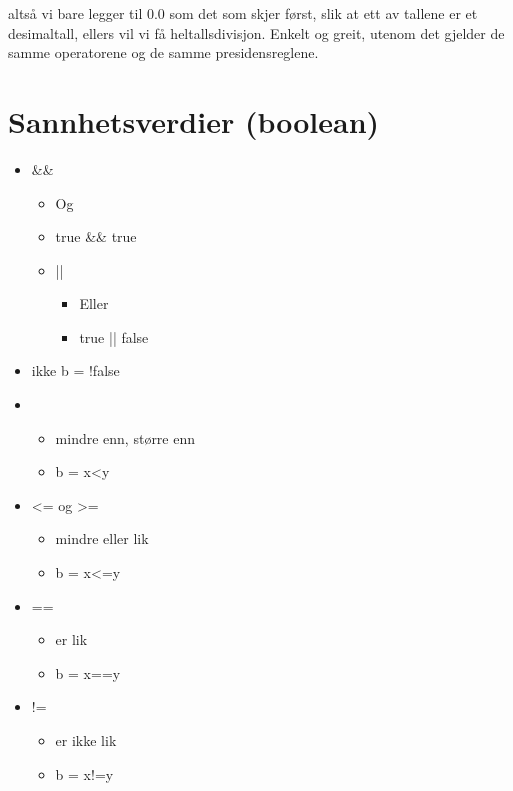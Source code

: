 \documentclass[a4paper,norsk,10pt]{article}
\begin{document}
   altså vi bare legger til 0.0 som det som skjer først, slik at ett av tallene er
   et desimaltall, ellers vil vi få heltallsdivisjon. Enkelt og greit,
   utenom det gjelder de samme operatorene og de samme presidensreglene.
\section{Sannhetsverdier (boolean)}
\label{sec-2}


\begin{itemize}
\item \&\&

\begin{itemize}
\item Og
\item true \&\& true
\item ||

\begin{itemize}
\item Eller
\item true || false
\end{itemize}

\end{itemize}

\item ikke
       b = !false
\item < og >

\begin{itemize}
\item mindre enn, større enn
\item b = x<y
\end{itemize}

\item <= og >=

\begin{itemize}
\item mindre eller lik
\item b = x<=y
\end{itemize}

\item ==

\begin{itemize}
\item er lik
\item b = x==y
\end{itemize}

\item !=

\begin{itemize}
\item er ikke lik
\item b = x!=y
\end{itemize}

\end{itemize}
\end{document}
